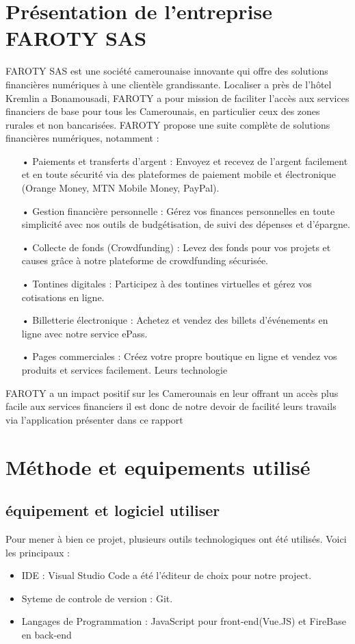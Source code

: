 \documentclass[a4paper,12pt]{report}
\begin{document}
\chapter{Présentation de l'entreprise FAROTY SAS} 
FAROTY SAS est une société camerounaise innovante qui offre des solutions financières numériques à une clientèle grandissante. Localiser a près de l’hôtel Kremlin a Bonamousadi, FAROTY a pour mission de faciliter l'accès aux services financiers de base pour tous les Camerounais, en particulier ceux des zones rurales et non bancarisées.
FAROTY propose une suite complète de solutions financières numériques, notamment :
\begin{itemize}
\item[•] Paiements et transferts d'argent : Envoyez et recevez de l'argent facilement et en toute sécurité via des plateformes de paiement mobile et électronique (Orange Money, MTN Mobile Money, PayPal). 
\item[•] Gestion financière personnelle : Gérez vos finances personnelles en toute simplicité avec nos outils de budgétisation, de suivi des dépenses et d'épargne. 
\item[•] Collecte de fonds (Crowdfunding) : Levez des fonds pour vos projets et causes grâce à notre plateforme de crowdfunding sécurisée. 
\item[•] Tontines digitales : Participez à des tontines virtuelles et gérez vos cotisations en ligne. 
\item[•] Billetterie électronique : Achetez et vendez des billets d'événements en ligne avec notre service ePass. 
\item[•] Pages commerciales : Créez votre propre boutique en ligne et vendez vos produits et services facilement. 
Leurs technologie
\end{itemize} 
FAROTY a un impact positif sur les Camerounais en leur offrant un accès plus facile aux services financiers il est donc de notre devoir de facilité leurs travails via l'application présenter dans ce rapport

\chapter{Méthode et equipements utilisé}
\section{équipement et logiciel utiliser}

Pour mener à bien ce projet, plusieurs outils technologiques ont été utilisés. Voici les principaux :
\begin{itemize}
\item IDE : Visual Studio Code a été l'éditeur de choix pour notre project.
\item Syteme de controle de version : Git.
\item Langages de Programmation : JavaScript pour front-end(Vue.JS) et FireBase en back-end
\end{itemize}
\end{document}
